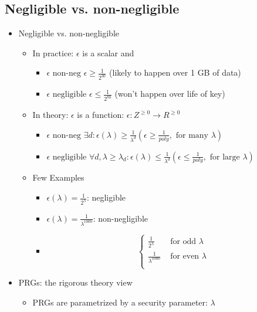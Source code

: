 \documentclass[]{article}
\begin{document}
\subsection{Negligible vs. non-negligible}
\begin{itemize}
	\item Negligible vs. non-negligible
	\begin{itemize}
		\item In practice: $\epsilon$ is a scalar and
		\begin{itemize}
			\item $\epsilon \text{ non-neg } \epsilon \geq \frac{1}{2^{30}}$ (likely to happen over 1 GB of data)
			\item $\epsilon \text { negligible } \epsilon \leq \frac{1}{2^{80}}$ (won't happen over life of key)
		\end{itemize}
		\item In theory: $\epsilon$ is a function: $\epsilon: Z^{\geq 0} \rightarrow R^{\geq 0}$
		\begin{itemize}
			\item $\epsilon \text{ non-neg } \exists d: \epsilon(\lambda) \geq \frac{1}{\lambda^{d}} (\epsilon \geq \frac{1}{poly}, \text{ for many } \lambda) $
			\item $\epsilon \text{ negligible } \forall d, \lambda \geq \lambda_{d}: \epsilon(\lambda) \leq \frac{1}{\lambda^{d}} (\epsilon \leq \frac{1}{poly}, \text{ for large } \lambda) $
		\end{itemize}
		\item Few Examples
		\begin{itemize}
			\item $\epsilon(\lambda) = \frac{1}{2^{\lambda}}$: negligible
			\item $\epsilon(\lambda) = \frac{1}{\lambda^{1000}}$: non-negligible
			\item \[ 
			\begin{cases}
			\frac{1}{2^{\lambda}} & \text{ for odd } \lambda \\
			\frac{1}{\lambda^{1000}} & \text{ for even } \lambda \\
			\end{cases}
			\]
		\end{itemize}
	\end{itemize}
	\item PRGs: the rigorous theory view
	\begin{itemize}
		\item PRGs are parametrized by a security parameter: $\lambda$
		\begin{itemize}

\end{itemize}
\end{itemize}
\end{itemize}
\end{document}
